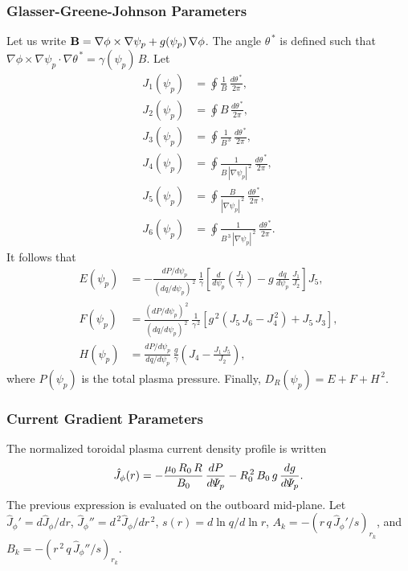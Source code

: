 \documentclass[12pt,prb,aps]{revtex4-1}
\begin{document}
\subsubsection{Glasser-Greene-Johnson Parameters}\label{ggjs}
Let us write
${\bf B} = \nabla\phi\times\nabla\psi_p+g(\psi_p)\,\nabla\phi$. 
The angle $\theta^{\,\ast}$ is defined such that
$\nabla\phi\times\nabla\psi_p\cdot\nabla\theta^{\,\ast} = \gamma(\psi_p)\,B$.
Let
\begin{align}
J_1(\psi_p) &= \oint\frac{1}{B}\,\frac{d\theta^{\,\ast}}{2\pi},\\[0.5ex]
J_2(\psi_p) &= \oint B\,\frac{d\theta^{\,\ast}}{2\pi},\\[0.5ex]
J_3(\psi_p) &= \oint\frac{1}{B^{\,3}}\,\frac{d\theta^{\,\ast}}{2\pi},\\[0.5ex]
J_4(\psi_p) &= \oint\frac{1}{B\,|\nabla\psi_p|^{\,2}}\,\frac{d\theta^{\,\ast}}{2\pi},\\[0.5ex]
J_5(\psi_p) &= \oint\frac{B}{|\nabla\psi_p|^{\,2}}\,\frac{d\theta^{\,\ast}}{2\pi},\\[0.5ex]
J_6(\psi_p) &= \oint\frac{1}{B^{\,3}\,|\nabla\psi_p|^{\,2}}\,\frac{d\theta^{\,\ast}}{2\pi}.
\end{align}
It follows that\,\cite{ggj}
\begin{align}
E(\psi_p) &= - \frac{dP/d\psi_p}{(dq/d\psi_p)^{\,2}}\,\frac{1}{\gamma}\left[\frac{d}{d\psi_p}\!\left(\frac{J_1}{\gamma}\right) - g\,\frac{dq}{d\psi_p}\,\frac{J_1}{J_2}\right]J_5,\\[0.5ex]
F(\psi_p) &= \frac{(dP/d\psi_p)^{\,2}}{(dq/d\psi_p)^{\,2}}\,\frac{1}{\gamma^{\,2}}\left[g^{\,2}\left(J_5\,J_6- J_4^{\,2}\right)+ J_5\,J_3\right],
\\[0.5ex]
H(\psi_p)&= \frac{dP/d\psi_p}{dq/d\psi_p}\,\frac{g}{\gamma}\left(J_4 - \frac{J_1\,J_5}{J_2}\right),
\end{align}
where $P(\psi_p)$ is the total plasma pressure. 
Finally,
$D_R(\psi_p)= E + F + H^{\,2}$. 

\subsubsection{Current Gradient Parameters}
The normalized toroidal plasma current density profile is written
\begin{equation}
\hat{J}_\phi(r) = - \frac{\mu_0\,R_0\,R}{B_0}\,\frac{dP}{d{\mit\Psi}_p} - R_0^{\,2}\,B_0\,g\,\frac{dg}{d{\mit\Psi}_p}.
\end{equation}
 The previous expression is evaluated on the outboard mid-plane.
Let $\hat{J}_\phi'=d\hat{J}_\phi/dr$, $\hat{J}_\phi'' = d^{\,2}\hat{J}_\phi/dr^{\,2}$, 
$s(r) = d\ln q/d\ln r$, 
$A_k = -(r\,q\,\hat{J}_\phi'/s)_{r_k}$, and 
$B_k = -(r^{\,2}\,q\,\hat{J}_\phi''/s)_{r_k}$. 
\end{document}

